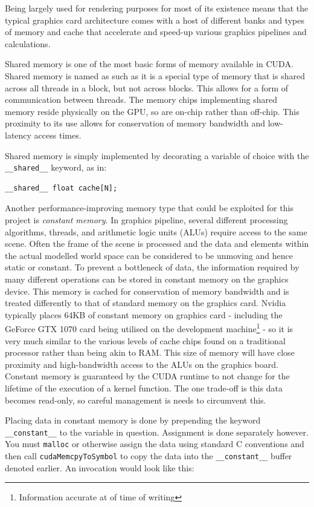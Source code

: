 \documentclass[conference]{IEEEtran}
\begin{document}
Being largely used for rendering purposes for most of its existence means that the typical graphics card architecture comes with a host of different banks and types of memory and cache that accelerate and speed-up various graphics pipelines and calculations.

Shared memory is one of the most basic forms of memory available in CUDA. Shared memory is named as such as it is a special type of memory that is shared across all threads in a block, but not across blocks. This allows for a form of communication between threads. The memory chips implementing shared memory reside physically on the GPU, so are on-chip rather than off-chip. This proximity to its use allows for conservation of memory bandwidth and low-latency access times.

Shared memory is simply implemented by decorating a variable of choice with the \texttt{\_\_shared\_\_} keyword, as in:

\begin{lstlisting}[breaklines]
    __shared__ float cache[N];
\end{lstlisting}

Another performance-improving memory type that could be exploited for this project is \textit{constant memory}. In graphics pipeline, several different processing algorithms, threads, and arithmetic logic units (ALUs) require access to the same scene. Often the frame of the scene is processed and the data and elements within the actual modelled world space can be considered to be unmoving and hence static or constant. To prevent a bottleneck of data, the information required by many different operations can be stored in constant memory on the graphics device. This memory is cached for conservation of memory bandwidth and is treated differently to that of standard memory on the graphics card. Nvidia typically places 64KB of constant memory on graphics card - including the GeForce GTX 1070 card being utilised on the development machine\footnote{Information accurate at of time of writing} - so it is very much similar to the various levels of cache chips found on a traditional processor rather than being akin to RAM. This size of memory will have close proximity and high-bandwidth access to the ALUs on the graphics board. Constant memory is guaranteed by the CUDA runtime to not change for the lifetime of the execution of a kernel function. The one trade-off is this data becomes read-only, so careful management is needs to circumvent this.

Placing data in constant memory is done by prepending the keyword \texttt{\_\_constant\_\_} to the variable in question. Assignment is done separately however. You must \texttt{malloc} or otherwise assign the data using standard C conventions and then call \texttt{cudaMemcpyToSymbol} to copy the data into the \texttt{\_\_constant\_\_} buffer denoted earlier. An invocation would look like this:
\end{document}
